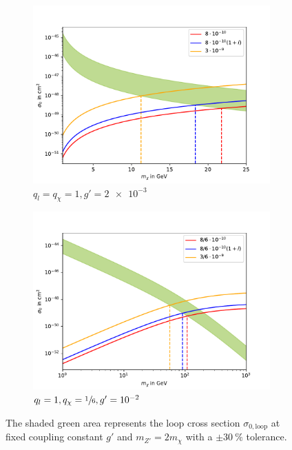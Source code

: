 \begin{figure}
	\centering
	\begin{subfigure}[]{0.8\textwidth}
		\includegraphics[width=\textwidth]{content/graphics/Relic11.pdf}
		\caption{$q_l=q_\chi=1,g'=\SI{2e-3}{}$}
		\label{fig:Relic11}
	\end{subfigure}
	\begin{subfigure}[]{0.8\textwidth}
		\includegraphics[width=\textwidth]{content/graphics/Relic116.pdf}
		\caption{$q_l=1,q_\chi=\sfrac{1}{6},g'=\SI{e-2}{}$}
		\label{fig:Relic116}
	\end{subfigure}
	\caption{The shaded green area represents the loop cross section $\sigma_{0,\text{loop}}$ at fixed coupling constant $g'$ and $m_{Z'} = 2m_\chi$ with a $\pm\SI{30}{\%}$ tolerance.}
	\label{fig:Relic}
\end{figure}